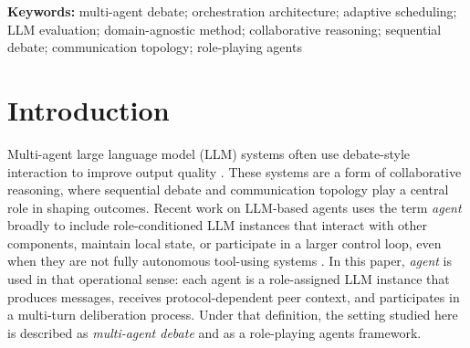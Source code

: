 \documentclass[11pt]{article}
\author{Ramtin Zargari Marandi\\\href{https://orcid.org/0000-0001-9233-1656}{ORCID: 0000-0001-9233-1656}}
\date{March 17, 2026}
\begin{document}
\maketitle

\begin{abstract}
In multi-agent debate (MAD) systems, performance gains are often reported; however, because the debate protocol (e.g., number of agents, rounds, and aggregation rule) is typically held fixed while model-related factors vary, it is difficult to disentangle protocol effects from model effects. To isolate these effects, we compare three main protocols, Within-Round (WR; agents see only current-round contributions), Cross-Round (CR; full prior-round context), and novel Rank-Adaptive Cross-Round (RA-CR; dynamically reorders agents and silences one per round via an external judge model), against a No-Interaction baseline (NI; independent responses without peer visibility). In a controlled macroeconomic case study (20 diverse events, five random seeds, matched prompts/decoding), RA-CR achieves faster convergence than CR, WR shows higher peer-referencing, and NI maximizes Argument Diversity (unaffected across the main protocols). These results reveal a trade-off between interaction (peer-referencing rate) and convergence (consensus formation), confirming protocol design matters. When consensus is prioritized, RA-CR outperforms the others.
\end{abstract}

\noindent\textbf{Keywords:} multi-agent debate; orchestration architecture; adaptive scheduling; LLM evaluation; domain-agnostic method; collaborative reasoning; sequential debate; communication topology; role-playing agents

\section{Introduction}
Multi-agent large language model (LLM) systems often use debate-style interaction to improve output quality \citep{du2024debate,liang2024divergent,wu2024autogen,li2023camel,hong2023metagpt,fan2026imad,zhu2026demystifying}. These systems are a form of collaborative reasoning, where sequential debate and communication topology play a central role in shaping outcomes. Recent work on LLM-based agents uses the term \emph{agent} broadly to include role-conditioned LLM instances that interact with other components, maintain local state, or participate in a larger control loop, even when they are not fully autonomous tool-using systems \citep{liu2024dylan,yehudai2025survey}. In this paper, \emph{agent} is used in that operational sense: each agent is a role-assigned LLM instance that produces messages, receives protocol-dependent peer context, and participates in a multi-turn deliberation process. Under that definition, the setting studied here is described as \emph{multi-agent debate} and as a role-playing agents framework.
\end{document}
